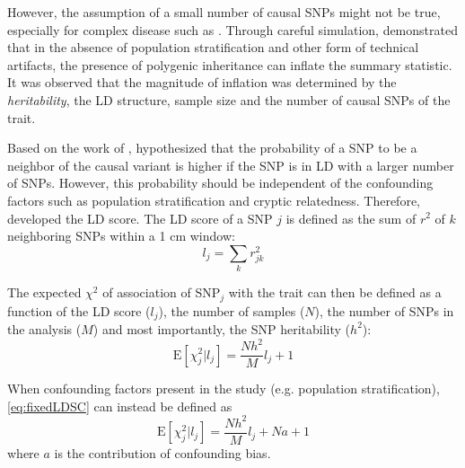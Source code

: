 	However, the assumption of a small number of causal \glspl{SNP} might not be true, especially for complex disease such as .
	Through careful simulation, \citet{Yang2011b} demonstrated that in the absence of population stratification and other form of technical artifacts, the presence of polygenic inheritance can inflate the summary statistic.
	It was observed that the magnitude of inflation was determined by the \emph{heritability}, the \gls{LD} structure, sample size and the number of causal \glspl{SNP} of the trait.
%	
	
	Based on the work of \citet{Yang2011b}, \citet{Bulik-Sullivan2015} hypothesized that the probability of a \gls{SNP} to be a neighbor of the causal variant is higher if the \gls{SNP} is in \gls{LD} with a larger number of \glspl{SNP}.
	However, this probability should be independent of the confounding factors such as population stratification and cryptic relatedness.
	Therefore, \citet{Bulik-Sullivan2015} developed the \gls{LD} score.
	The \gls{LD} score of a \gls{SNP} $j$ is defined as the sum of $r^2$ of $k$ neighboring \glspl{SNP} within a 1 \gls{cm} window:
	\begin{equation}
	l_j = \sum_kr^2_{jk}
	\label{eq:ldScore}
	\end{equation}
	
	The expected $\chi^2$ of association of \gls{SNP}$_j$ with the trait can then be defined as a function of the \gls{LD} score ($l_j$), the number of samples ($N$), the number of \glspl{SNP} in the analysis ($M$) and most importantly, the \gls{SNP} heritability ($h^2$):
	\begin{equation}
	\mathrm{E}[\chi^2_j | l_j] = \frac{Nh^2}{M}l_j+1
	\label{eq:fixedLDSC}
	\end{equation}
	
	When confounding factors present in the study (e.g. population stratification), \cref{eq:fixedLDSC} can instead be defined as
	\begin{equation}
	\mathrm{E}[\chi^2_j | l_j] = \frac{Nh^2}{M}l_j+Na+1
	\label{eq:fullLDSC}
	\end{equation}
	where $a$ is the contribution of confounding bias.
	
